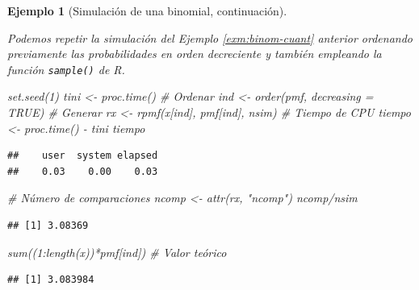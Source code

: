 \documentclass[
]{book}
\newenvironment{Shaded}{\begin{snugshade}}{\end{snugshade}}
\newcommand{\AttributeTok}[1]{\textcolor[rgb]{0.77,0.63,0.00}{#1}}
\newcommand{\CommentTok}[1]{\textcolor[rgb]{0.56,0.35,0.01}{\textit{#1}}}
\newcommand{\ConstantTok}[1]{\textcolor[rgb]{0.00,0.00,0.00}{#1}}
\newcommand{\DecValTok}[1]{\textcolor[rgb]{0.00,0.00,0.81}{#1}}
\newcommand{\FunctionTok}[1]{\textcolor[rgb]{0.00,0.00,0.00}{#1}}
\newcommand{\NormalTok}[1]{#1}
\newcommand{\OtherTok}[1]{\textcolor[rgb]{0.56,0.35,0.01}{#1}}
\newcommand{\SpecialCharTok}[1]{\textcolor[rgb]{0.00,0.00,0.00}{#1}}
\newcommand{\StringTok}[1]{\textcolor[rgb]{0.31,0.60,0.02}{#1}}
\theoremstyle{break}
\newtheorem{example}{Ejemplo}[chapter]
\theoremstyle{nonumberplain}
\begin{document}
\begin{example}[Simulación de una binomial, continuación]
\protect\hypertarget{exm:binom-cuantb}{}\label{exm:binom-cuantb}

Podemos repetir la simulación del Ejemplo \ref{exm:binom-cuant} anterior ordenando previamente las probabilidades en orden decreciente y también empleando la función \texttt{sample()} de R.

\begin{Shaded}
\begin{Highlighting}[]
\FunctionTok{set.seed}\NormalTok{(}\DecValTok{1}\NormalTok{)}
\NormalTok{tini }\OtherTok{\textless{}{-}} \FunctionTok{proc.time}\NormalTok{()}
\CommentTok{\# Ordenar}
\NormalTok{ind }\OtherTok{\textless{}{-}} \FunctionTok{order}\NormalTok{(pmf, }\AttributeTok{decreasing =} \ConstantTok{TRUE}\NormalTok{)}
\CommentTok{\# Generar}
\NormalTok{rx }\OtherTok{\textless{}{-}} \FunctionTok{rpmf}\NormalTok{(x[ind], pmf[ind], nsim)}
\CommentTok{\# Tiempo de CPU}
\NormalTok{tiempo }\OtherTok{\textless{}{-}} \FunctionTok{proc.time}\NormalTok{() }\SpecialCharTok{{-}}\NormalTok{ tini}
\NormalTok{tiempo}
\end{Highlighting}
\end{Shaded}

\begin{verbatim}
##    user  system elapsed 
##    0.03    0.00    0.03
\end{verbatim}

\begin{Shaded}
\begin{Highlighting}[]
\CommentTok{\# Número de comparaciones}
\NormalTok{ncomp }\OtherTok{\textless{}{-}} \FunctionTok{attr}\NormalTok{(rx, }\StringTok{"ncomp"}\NormalTok{)}
\NormalTok{ncomp}\SpecialCharTok{/}\NormalTok{nsim}
\end{Highlighting}
\end{Shaded}

\begin{verbatim}
## [1] 3.08369
\end{verbatim}

\begin{Shaded}
\begin{Highlighting}[]
\FunctionTok{sum}\NormalTok{((}\DecValTok{1}\SpecialCharTok{:}\FunctionTok{length}\NormalTok{(x))}\SpecialCharTok{*}\NormalTok{pmf[ind]) }\CommentTok{\# Valor teórico}
\end{Highlighting}
\end{Shaded}

\begin{verbatim}
## [1] 3.083984
\end{verbatim}


\end{example}
\end{document}

